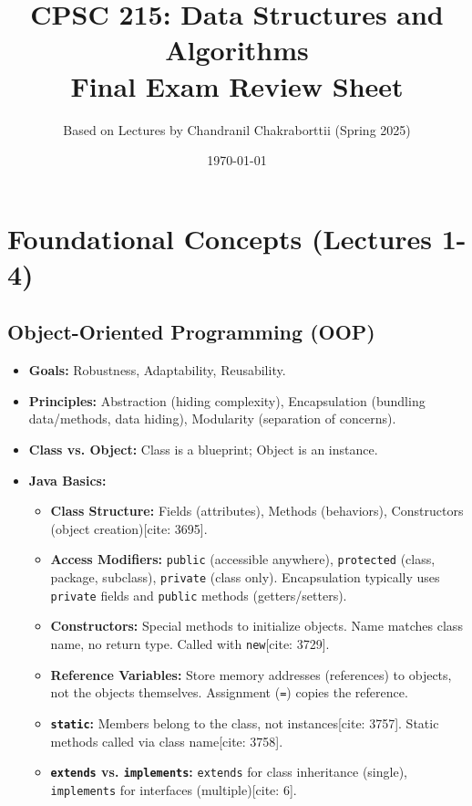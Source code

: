 \documentclass{article}
\title{CPSC 215: Data Structures and Algorithms \\ Final Exam Review Sheet}
\author{Based on Lectures by Chandranil Chakraborttii (Spring 2025)}
\date{\today}
\begin{document}
\maketitle

\section{Foundational Concepts (Lectures 1-4)}

\subsection{Object-Oriented Programming (OOP)}
\begin{itemize}
    \item \textbf{Goals:} Robustness, Adaptability, Reusability.
    \item \textbf{Principles:} Abstraction (hiding complexity), Encapsulation (bundling data/methods, data hiding), Modularity (separation of concerns).
    \item \textbf{Class vs. Object:} Class is a blueprint; Object is an instance.
    \item \textbf{Java Basics:}
          \begin{itemize}
              \item \textbf{Class Structure:} Fields (attributes), Methods (behaviors), Constructors (object creation)[cite: 3695].
              \item \textbf{Access Modifiers:} \texttt{public} (accessible anywhere), \texttt{protected} (class, package, subclass), \texttt{private} (class only). Encapsulation typically uses \texttt{private} fields and \texttt{public} methods (getters/setters).
              \item \textbf{Constructors:} Special methods to initialize objects. Name matches class name, no return type. Called with \texttt{new}[cite: 3729].
              \item \textbf{Reference Variables:} Store memory addresses (references) to objects, not the objects themselves. Assignment (\texttt{=}) copies the reference.
              \item \textbf{\texttt{static}:} Members belong to the class, not instances[cite: 3757]. Static methods called via class name[cite: 3758].
              \item \textbf{\texttt{extends} vs. \texttt{implements}:} \texttt{extends} for class inheritance (single), \texttt{implements} for interfaces (multiple)[cite: 6].
          \end{itemize}

\end{itemize}
\end{document}
